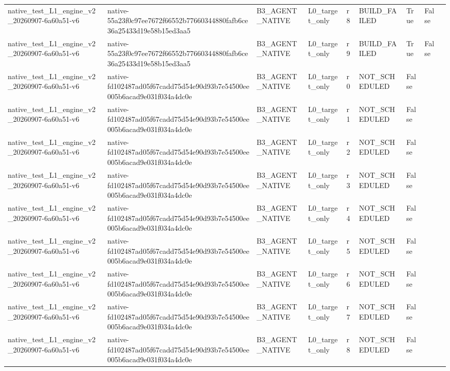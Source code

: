 \begin{tabular}{lllllllll}
native\_test\_L1\_engine\_v2\_20260907-6a60a51-v6 & native-55a23f0c97ee7672f66552b77660344880fafb6ce36a25433d19e58b15ed3aa5 & B3\_AGENT\_NATIVE & L0\_target\_only & r8 & BUILD\_FAILED & True & False &  \\
native\_test\_L1\_engine\_v2\_20260907-6a60a51-v6 & native-55a23f0c97ee7672f66552b77660344880fafb6ce36a25433d19e58b15ed3aa5 & B3\_AGENT\_NATIVE & L0\_target\_only & r9 & BUILD\_FAILED & True & False &  \\
native\_test\_L1\_engine\_v2\_20260907-6a60a51-v6 & native-fd102487ad05f67cadd75d54e90d93b7e54500ee005b6acad9e031f034a4dc0e & B3\_AGENT\_NATIVE & L0\_target\_only & r0 & NOT\_SCHEDULED & False &  &  \\
native\_test\_L1\_engine\_v2\_20260907-6a60a51-v6 & native-fd102487ad05f67cadd75d54e90d93b7e54500ee005b6acad9e031f034a4dc0e & B3\_AGENT\_NATIVE & L0\_target\_only & r1 & NOT\_SCHEDULED & False &  &  \\
native\_test\_L1\_engine\_v2\_20260907-6a60a51-v6 & native-fd102487ad05f67cadd75d54e90d93b7e54500ee005b6acad9e031f034a4dc0e & B3\_AGENT\_NATIVE & L0\_target\_only & r2 & NOT\_SCHEDULED & False &  &  \\
native\_test\_L1\_engine\_v2\_20260907-6a60a51-v6 & native-fd102487ad05f67cadd75d54e90d93b7e54500ee005b6acad9e031f034a4dc0e & B3\_AGENT\_NATIVE & L0\_target\_only & r3 & NOT\_SCHEDULED & False &  &  \\
native\_test\_L1\_engine\_v2\_20260907-6a60a51-v6 & native-fd102487ad05f67cadd75d54e90d93b7e54500ee005b6acad9e031f034a4dc0e & B3\_AGENT\_NATIVE & L0\_target\_only & r4 & NOT\_SCHEDULED & False &  &  \\
native\_test\_L1\_engine\_v2\_20260907-6a60a51-v6 & native-fd102487ad05f67cadd75d54e90d93b7e54500ee005b6acad9e031f034a4dc0e & B3\_AGENT\_NATIVE & L0\_target\_only & r5 & NOT\_SCHEDULED & False &  &  \\
native\_test\_L1\_engine\_v2\_20260907-6a60a51-v6 & native-fd102487ad05f67cadd75d54e90d93b7e54500ee005b6acad9e031f034a4dc0e & B3\_AGENT\_NATIVE & L0\_target\_only & r6 & NOT\_SCHEDULED & False &  &  \\
native\_test\_L1\_engine\_v2\_20260907-6a60a51-v6 & native-fd102487ad05f67cadd75d54e90d93b7e54500ee005b6acad9e031f034a4dc0e & B3\_AGENT\_NATIVE & L0\_target\_only & r7 & NOT\_SCHEDULED & False &  &  \\
native\_test\_L1\_engine\_v2\_20260907-6a60a51-v6 & native-fd102487ad05f67cadd75d54e90d93b7e54500ee005b6acad9e031f034a4dc0e & B3\_AGENT\_NATIVE & L0\_target\_only & r8 & NOT\_SCHEDULED & False &  &  \\

\end{tabular}
